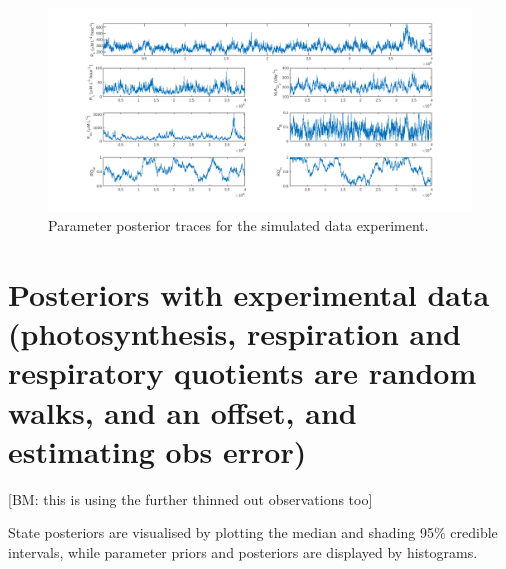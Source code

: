 \documentclass{ruthesis}
\begin{document}
\begin{figure}
	\centerline{\includegraphics[width=1.3\textwidth]{images_microalgae/posterior_plots_with_fake_data/model_parameters_traces}}
	\caption[.]{Parameter posterior traces for the simulated data experiment.}
	\label{fig:micro_sim_model_parameters_traces}
\end{figure}


\FloatBarrier
\chapter{Posteriors with experimental data (photosynthesis, respiration and respiratory quotients are random walks, and an offset, and estimating obs error)}

[BM: this is using the further thinned out observations too]

State posteriors are visualised by plotting the median and shading 95\% credible intervals, while parameter priors and posteriors are displayed by histograms.
\end{document}
